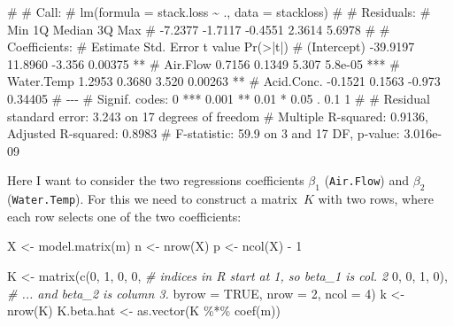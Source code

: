 \documentclass[
  a4paper,
]{article}
\newenvironment{Shaded}{\begin{snugshade}}{\end{snugshade}}
\newcommand{\AttributeTok}[1]{\textcolor[rgb]{0.77,0.63,0.00}{#1}}
\newcommand{\CommentTok}[1]{\textcolor[rgb]{0.56,0.35,0.01}{\textit{#1}}}
\newcommand{\ConstantTok}[1]{\textcolor[rgb]{0.00,0.00,0.00}{#1}}
\newcommand{\DecValTok}[1]{\textcolor[rgb]{0.00,0.00,0.81}{#1}}
\newcommand{\FunctionTok}[1]{\textcolor[rgb]{0.00,0.00,0.00}{#1}}
\newcommand{\NormalTok}[1]{#1}
\newcommand{\OtherTok}[1]{\textcolor[rgb]{0.56,0.35,0.01}{#1}}
\newcommand{\SpecialCharTok}[1]{\textcolor[rgb]{0.00,0.00,0.00}{#1}}
\theoremstyle{definition}
\theoremstyle{definition}
\theoremstyle{definition}
\theoremstyle{definition}
\theoremstyle{remark}
\begin{document}
\begin{Shaded}
\begin{Highlighting}[]
\NormalTok{\# }
\NormalTok{\# Call:}
\NormalTok{\# lm(formula = stack.loss \textasciitilde{} ., data = stackloss)}
\NormalTok{\# }
\NormalTok{\# Residuals:}
\NormalTok{\#     Min      1Q  Median      3Q     Max }
\NormalTok{\# {-}7.2377 {-}1.7117 {-}0.4551  2.3614  5.6978 }
\NormalTok{\# }
\NormalTok{\# Coefficients:}
\NormalTok{\#             Estimate Std. Error t value Pr(\textgreater{}|t|)    }
\NormalTok{\# (Intercept) {-}39.9197    11.8960  {-}3.356  0.00375 ** }
\NormalTok{\# Air.Flow      0.7156     0.1349   5.307  5.8e{-}05 ***}
\NormalTok{\# Water.Temp    1.2953     0.3680   3.520  0.00263 ** }
\NormalTok{\# Acid.Conc.   {-}0.1521     0.1563  {-}0.973  0.34405    }
\NormalTok{\# {-}{-}{-}}
\NormalTok{\# Signif. codes:  0 \textquotesingle{}***\textquotesingle{} 0.001 \textquotesingle{}**\textquotesingle{} 0.01 \textquotesingle{}*\textquotesingle{} 0.05 \textquotesingle{}.\textquotesingle{} 0.1 \textquotesingle{} \textquotesingle{} 1}
\NormalTok{\# }
\NormalTok{\# Residual standard error: 3.243 on 17 degrees of freedom}
\NormalTok{\# Multiple R{-}squared:  0.9136,  Adjusted R{-}squared:  0.8983 }
\NormalTok{\# F{-}statistic:  59.9 on 3 and 17 DF,  p{-}value: 3.016e{-}09}
\end{Highlighting}
\end{Shaded}

Here I want to consider the two regressions coefficients \(\beta_1\) (\texttt{Air.Flow})
and \(\beta_2\) (\texttt{Water.Temp}). For this we need to construct a matrix~\(K\)
with two rows, where each row selects one of the two coefficients:

\begin{Shaded}
\begin{Highlighting}[]
\NormalTok{X }\OtherTok{\textless{}{-}} \FunctionTok{model.matrix}\NormalTok{(m)}
\NormalTok{n }\OtherTok{\textless{}{-}} \FunctionTok{nrow}\NormalTok{(X)}
\NormalTok{p }\OtherTok{\textless{}{-}} \FunctionTok{ncol}\NormalTok{(X) }\SpecialCharTok{{-}} \DecValTok{1}

\NormalTok{K }\OtherTok{\textless{}{-}} \FunctionTok{matrix}\NormalTok{(}\FunctionTok{c}\NormalTok{(}\DecValTok{0}\NormalTok{, }\DecValTok{1}\NormalTok{, }\DecValTok{0}\NormalTok{, }\DecValTok{0}\NormalTok{,   }\CommentTok{\# indices in R start at 1, so beta\_1 is col. 2}
              \DecValTok{0}\NormalTok{, }\DecValTok{0}\NormalTok{, }\DecValTok{1}\NormalTok{, }\DecValTok{0}\NormalTok{),  }\CommentTok{\# ... and beta\_2 is column 3.}
            \AttributeTok{byrow =} \ConstantTok{TRUE}\NormalTok{,}
            \AttributeTok{nrow =} \DecValTok{2}\NormalTok{, }\AttributeTok{ncol =} \DecValTok{4}\NormalTok{)}
\NormalTok{k }\OtherTok{\textless{}{-}} \FunctionTok{nrow}\NormalTok{(K)}
\NormalTok{K.beta.hat }\OtherTok{\textless{}{-}} \FunctionTok{as.vector}\NormalTok{(K }\SpecialCharTok{\%*\%} \FunctionTok{coef}\NormalTok{(m))}
\end{Highlighting}
\end{Shaded}
\end{document}
